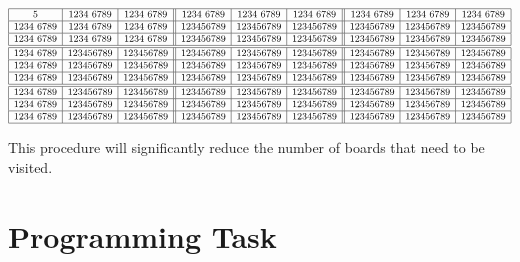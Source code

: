 \documentclass{book}
\begin{document}
\[
\small
\begin{array}{|c|c|c||c|c|c||c|c|c|}
\hline
5 & 1234~6789 & 1234~6789 & 1234~6789 & 1234~6789 & 1234~6789 & 1234~6789 & 1234~6789 & 1234~6789 \\
\hline
1234~6789 & 1234~6789 & 1234~6789 & 123456789 & 123456789 & 123456789 & 123456789 & 123456789 & 123456789 \\
\hline
1234~6789 & 1234~6789 & 1234~6789 & 123456789 & 123456789 & 123456789 & 123456789 & 123456789 & 123456789 \\
\hline \hline
1234~6789 & 123456789 & 123456789 & 123456789 & 123456789 & 123456789 & 123456789 & 123456789 & 123456789 \\
\hline
1234~6789 & 123456789 & 123456789 & 123456789 & 123456789 & 123456789 & 123456789 & 123456789 & 123456789 \\
\hline
1234~6789 & 123456789 & 123456789 & 123456789 & 123456789 & 123456789 & 123456789 & 123456789 & 123456789 \\
\hline \hline
1234~6789 & 123456789 & 123456789 & 123456789 & 123456789 & 123456789 & 123456789 & 123456789 & 123456789 \\
\hline
1234~6789 & 123456789 & 123456789 & 123456789 & 123456789 & 123456789 & 123456789 & 123456789 & 123456789 \\
\hline
1234~6789 & 123456789 & 123456789 & 123456789 & 123456789 & 123456789 & 123456789 & 123456789 & 123456789 \\
\hline
\end{array}
\]

This procedure will significantly reduce the number of boards that need to
be visited.

\section{Programming Task}
\end{document}
